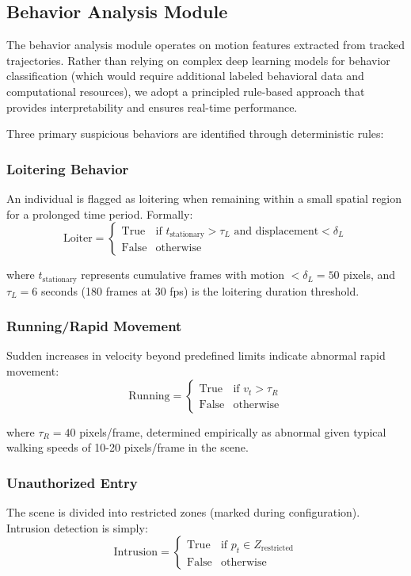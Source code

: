 \documentclass[conference]{IEEEtran}
\begin{document}
\subsection{Behavior Analysis Module}

The behavior analysis module operates on motion features extracted from tracked trajectories. Rather than relying on complex deep learning models for behavior classification (which would require additional labeled behavioral data and computational resources), we adopt a principled rule-based approach that provides interpretability and ensures real-time performance.

Three primary suspicious behaviors are identified through deterministic rules:

\subsubsection{Loitering Behavior}
An individual is flagged as loitering when remaining within a small spatial region for a prolonged time period. Formally:
\[
\text{Loiter} = \begin{cases}
\text{True} & \text{if } t_{\text{stationary}} > \tau_L \text{ and } \text{displacement} < \delta_L \\
\text{False} & \text{otherwise}
\end{cases}
\]

where $t_{\text{stationary}}$ represents cumulative frames with motion $< \delta_L = 50$ pixels, and $\tau_L = 6$ seconds (180 frames at 30 fps) is the loitering duration threshold.

\subsubsection{Running/Rapid Movement}
Sudden increases in velocity beyond predefined limits indicate abnormal rapid movement:
\[
\text{Running} = \begin{cases}
\text{True} & \text{if } v_t > \tau_R \\
\text{False} & \text{otherwise}
\end{cases}
\]

where $\tau_R = 40$ pixels/frame, determined empirically as abnormal given typical walking speeds of 10-20 pixels/frame in the scene.

\subsubsection{Unauthorized Entry}
The scene is divided into restricted zones (marked during configuration). Intrusion detection is simply:
\[
\text{Intrusion} = \begin{cases}
\text{True} & \text{if } p_t \in Z_{\text{restricted}} \\
\text{False} & \text{otherwise}
\end{cases}
\]
\end{document}

